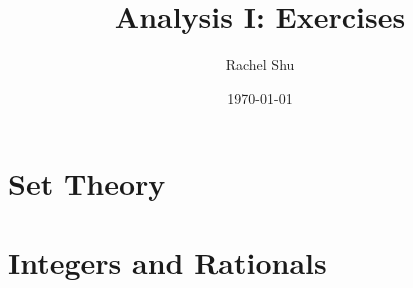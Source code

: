 \documentclass[]{report}
\title{Analysis I: Exercises}
\author{Rachel Shu}
\date{\today}
\newif\ifmainfile
\begin{document}
\mainfiletrue

\maketitle
\tableofcontents

\addtocounter{chapter}{2}
\chapter{Set Theory}

\chapter{Integers and Rationals}
\end{document}
